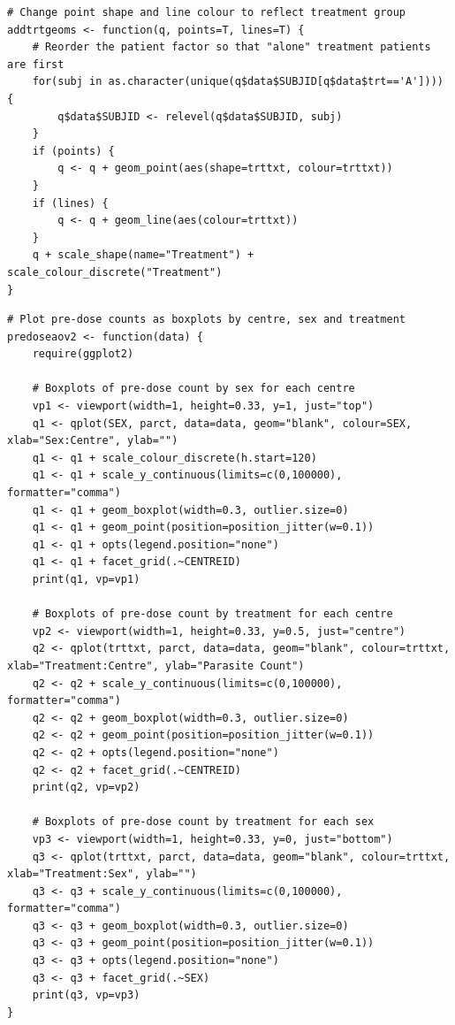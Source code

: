 \begin{singlespace}
\begin{lstlisting}[caption=Plot raw count data for male and female subjects side-by-side,label=R:rawggplot]
# Change point shape and line colour to reflect treatment group
addtrtgeoms <- function(q, points=T, lines=T) {
	# Reorder the patient factor so that "alone" treatment patients are first
	for(subj in as.character(unique(q$data$SUBJID[q$data$trt=='A']))) {
		q$data$SUBJID <- relevel(q$data$SUBJID, subj)
	}
	if (points) {
		q <- q + geom_point(aes(shape=trttxt, colour=trttxt))
	}
	if (lines) {
		q <- q + geom_line(aes(colour=trttxt))
	}
	q + scale_shape(name="Treatment") + scale_colour_discrete("Treatment")
}
\end{lstlisting}

\begin{lstlisting}[caption=Boxplots of pre-dose count by sex\, centre and treatment,label=R:predoseaov]
# Plot pre-dose counts as boxplots by centre, sex and treatment
predoseaov2 <- function(data) {
	require(ggplot2)

	# Boxplots of pre-dose count by sex for each centre
	vp1 <- viewport(width=1, height=0.33, y=1, just="top")
	q1 <- qplot(SEX, parct, data=data, geom="blank", colour=SEX, xlab="Sex:Centre", ylab="")
	q1 <- q1 + scale_colour_discrete(h.start=120)
	q1 <- q1 + scale_y_continuous(limits=c(0,100000), formatter="comma")
	q1 <- q1 + geom_boxplot(width=0.3, outlier.size=0)
	q1 <- q1 + geom_point(position=position_jitter(w=0.1))
	q1 <- q1 + opts(legend.position="none")
	q1 <- q1 + facet_grid(.~CENTREID)
	print(q1, vp=vp1)

	# Boxplots of pre-dose count by treatment for each centre
	vp2 <- viewport(width=1, height=0.33, y=0.5, just="centre")
	q2 <- qplot(trttxt, parct, data=data, geom="blank", colour=trttxt, xlab="Treatment:Centre", ylab="Parasite Count")
	q2 <- q2 + scale_y_continuous(limits=c(0,100000), formatter="comma")
	q2 <- q2 + geom_boxplot(width=0.3, outlier.size=0)
	q2 <- q2 + geom_point(position=position_jitter(w=0.1))
	q2 <- q2 + opts(legend.position="none")
	q2 <- q2 + facet_grid(.~CENTREID)
	print(q2, vp=vp2)

	# Boxplots of pre-dose count by treatment for each sex
	vp3 <- viewport(width=1, height=0.33, y=0, just="bottom")
	q3 <- qplot(trttxt, parct, data=data, geom="blank", colour=trttxt, xlab="Treatment:Sex", ylab="")
	q3 <- q3 + scale_y_continuous(limits=c(0,100000), formatter="comma")
	q3 <- q3 + geom_boxplot(width=0.3, outlier.size=0)
	q3 <- q3 + geom_point(position=position_jitter(w=0.1))
	q3 <- q3 + opts(legend.position="none")
	q3 <- q3 + facet_grid(.~SEX)
	print(q3, vp=vp3)
}
\end{lstlisting}


\end{singlespace}
